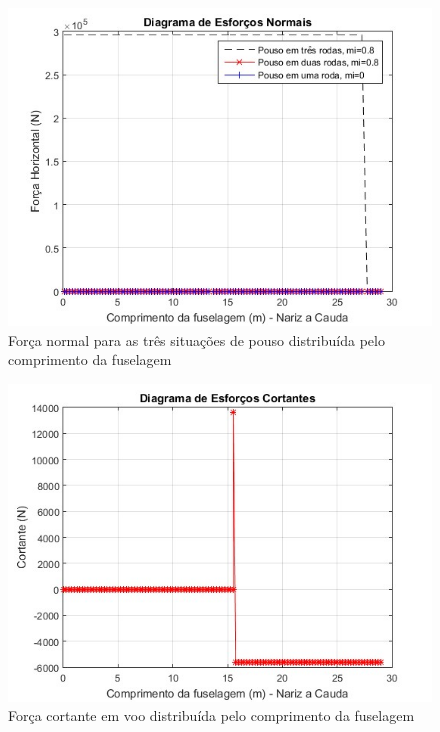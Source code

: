 \begin{figure}
\centering
\includegraphics[width=\textwidth]{cargas/imagens/norm_FUS.jpg}
\caption{Força normal para as três situações de pouso distribuída pelo comprimento da fuselagem }
\label{fig:norm_FUS}
\end{figure}


\begin{figure}
\centering
\includegraphics[width=\textwidth]{cargas/imagens/cort_FUSV.jpg}
\caption{Força cortante em voo distribuída pelo comprimento da fuselagem}
\label{fig:cort_FUSV}
\end{figure}

